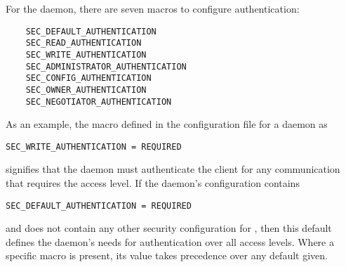For the daemon, there are seven macros to configure authentication:
\begin{verbatim}
    SEC_DEFAULT_AUTHENTICATION
    SEC_READ_AUTHENTICATION
    SEC_WRITE_AUTHENTICATION
    SEC_ADMINISTRATOR_AUTHENTICATION
    SEC_CONFIG_AUTHENTICATION
    SEC_OWNER_AUTHENTICATION
    SEC_NEGOTIATOR_AUTHENTICATION
\end{verbatim}

As an example, the macro defined in the configuration file
for a daemon as
\begin{verbatim}
SEC_WRITE_AUTHENTICATION = REQUIRED
\end{verbatim}
signifies that the daemon must authenticate the client for
any communication that requires the  access level.
If the daemon's configuration contains
\begin{verbatim}
SEC_DEFAULT_AUTHENTICATION = REQUIRED
\end{verbatim}
and does not contain any other security configuration for
\verb@AUTHENTICATION@, then this default defines the daemon's needs
for authentication over all access levels.
Where a specific macro is present, its value takes
precedence over any default given.


